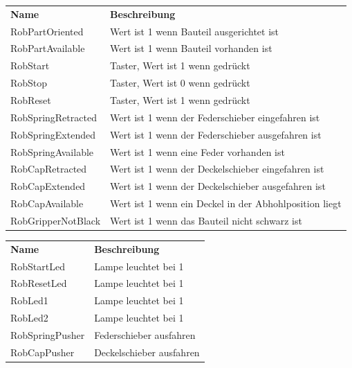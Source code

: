 \documentclass[11pt,a4paper,ngerman]{article}
\begin{document}
\begin{center}
	\setlength\extrarowheight{4pt}
	\small
	\begin{tabularx}{\textwidth}{|p{4cm}|X|}
		\hline
		\rowcolor{tublau}
		\multicolumn{2}{|c|}{\bf \color{white} \large Sensoren}\\
		\hline\hline
		\rowcolor{gray!80}
		\bf Name & \bf Beschreibung\\
		\hline\hline
		RobPartOriented & Wert ist 1 wenn Bauteil ausgerichtet ist\\
		RobPartAvailable & Wert ist 1 wenn Bauteil vorhanden ist\\
		RobStart & Taster, Wert ist 1 wenn gedrückt\\
		RobStop & Taster, Wert ist 0 wenn gedrückt\\
		RobReset & Taster, Wert ist 1 wenn gedrückt\\
		RobSpringRetracted & Wert ist 1 wenn der Federschieber eingefahren ist\\
		RobSpringExtended & Wert ist 1 wenn der Federschieber ausgefahren ist\\
		RobSpringAvailable & Wert ist 1 wenn eine Feder vorhanden ist\\
		RobCapRetracted & Wert ist 1 wenn der Deckelschieber eingefahren ist\\
		RobCapExtended & Wert ist 1 wenn der Deckelschieber ausgefahren ist\\
		RobCapAvailable & Wert ist 1 wenn ein Deckel in der Abhohlposition liegt\\
		RobGripperNotBlack & Wert ist 1 wenn das Bauteil nicht schwarz ist\\
		\hline
	\end{tabularx}
	
	\medskip
	
	\begin{tabularx}{\textwidth}{|p{4cm}|X|}
		\hline
		\rowcolor{tublau}
		\multicolumn{2}{|c|}{\bf \color{white} \large Aktoren}\\
		\hline\hline
		\rowcolor{gray!80}
		\bf Name & \bf Beschreibung\\
		\hline\hline
		RobStartLed & Lampe leuchtet bei 1\\
		RobResetLed & Lampe leuchtet bei 1\\
		RobLed1 & Lampe leuchtet bei 1\\
		RobLed2 & Lampe leuchtet bei 1\\
		RobSpringPusher & Federschieber ausfahren\\
		RobCapPusher & Deckelschieber ausfahren\\
		\hline
	\end{tabularx}
\end{center}
\end{document}
